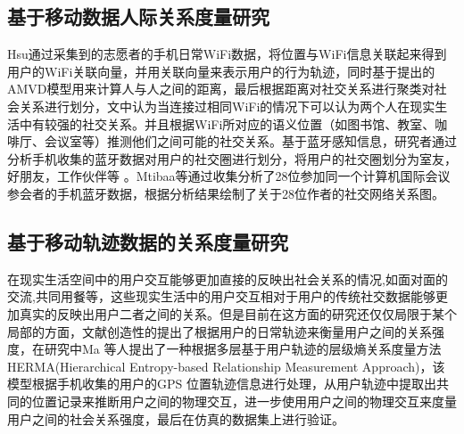 \subsection{基于移动数据人际关系度量研究}
Hsu通过采集到的志愿者的手机日常WiFi数据，将位置与WiFi信息关联起来得到用户的WiFi关联向量，并用关联向量来表示用户的行为轨迹，同时基于提出的AMVD模型用来计算人与人之间的距离，最后根据距离对社交关系进行聚类对社会关系进行划分，文中认为当连接过相同WiFi的情况下可以认为两个人在现实生活中有较强的社交关系。并且根据WiFi所对应的语义位置（如图书馆、教室、咖啡厅、会议室等）推测他们之间可能的社交关系。基于蓝牙感知信息，研究者通过分析手机收集的蓝牙数据对用户的社交圈进行划分，将用户的社交圈划分为室友，好朋友，工作伙伴等
。Mtibaa等通过收集分析了28位参加同一个计算机国际会议参会者的手机蓝牙数据，根据分析结果绘制了关于28位作者的社交网络关系图。
\subsection{基于移动轨迹数据的关系度量研究}
在现实生活空间中的用户交互能够更加直接的反映出社会关系的情况,如面对面的交流,共同用餐等，这些现实生活中的用户交互相对于用户的传统社交数据能够更加真实的反映出用户二者之间的关系。但是目前在这方面的研究还仅仅局限于某个局部的方面，文献\cite{ma2014effective}创造性的提出了根据用户的日常轨迹来衡量用户之间的关系强度，在研究中Ma 等人提出了一种根据多层基于用户轨迹的层级熵关系度量方法HERMA(Hierarchical Entropy-based Relationship Measurement Approach)，该模型根据手机收集的用户的GPS 位置轨迹信息进行处理，从用户轨迹中提取出共同的位置记录来推断用户之间的物理交互，进一步使用用户之间的物理交互来度量用户之间的社会关系强度，最后在仿真的数据集上进行验证。



